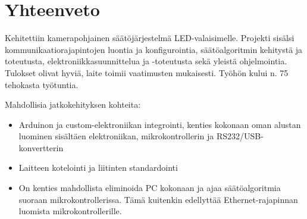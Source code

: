 \documentclass[finnish,12pt]{article}
\begin{document}
\section{Yhteenveto}

Kehitettiin kamerapohjainen säätöjärjestelmä LED-valaisimelle. Projekti sisälsi kommunikaatio\-rajapintojen luontia ja konfigurointia, säätö\-algoritmin kehitystä ja toteutusta, elektroniikka\-suunnittelua ja -toteutusta sekä yleistä ohjelmointia. Tulokset olivat hyviä, laite toimii vaatimusten mukaisesti. Työhön kului n. 75 tehokasta työtuntia.

Mahdollisia jatkokehityksen kohteita:
\begin{itemize}
 \item Arduinon ja custom-elektroniikan integrointi, kenties kokonaan oman alustan luominen sisältäen elektroniikan, mikrokontrollerin ja RS232/USB-konvertterin
 \item Laitteen kotelointi ja liitinten standardointi
 \item On kenties mahdollista eliminoida PC kokonaan ja ajaa säätöalgoritmia suoraan mikrokontrollerissa. Tämä kuitenkin edellyttää Ethernet-rajapinnan luomista mikrokontrollerille.
\end{itemize}


\clearpage


\end{document}
